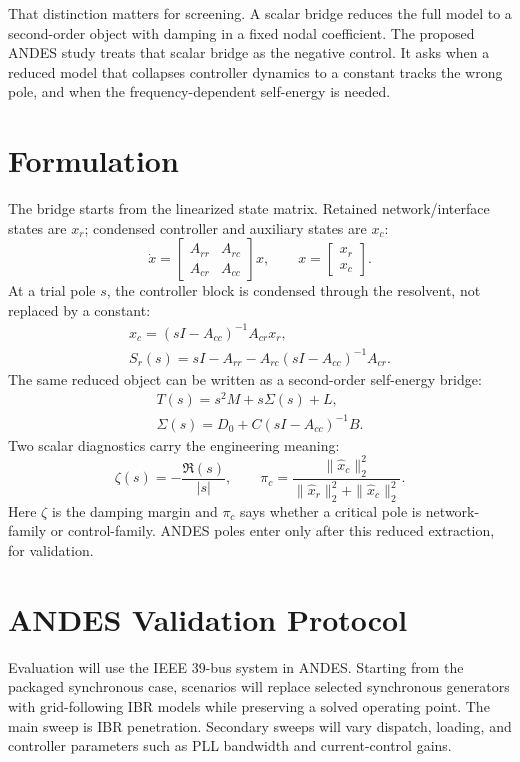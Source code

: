 \documentclass[conference,9pt]{IEEEtran}
\begin{document}
That distinction matters for screening. A scalar bridge reduces the full model to a second-order object with damping in a fixed nodal coefficient. The proposed ANDES study treats that scalar bridge as the negative control. It asks when a reduced model that collapses controller dynamics to a constant tracks the wrong pole, and when the frequency-dependent self-energy is needed.

\section{Formulation}

The bridge starts from the linearized state matrix. Retained network/interface states are \(x_r\); condensed controller and auxiliary states are \(x_c\):
{\small
\[
\dot{x}=\begin{bmatrix}A_{rr}&A_{rc}\\A_{cr}&A_{cc}\end{bmatrix}x,
\qquad
x=\begin{bmatrix}x_r\\x_c\end{bmatrix}.
\]
}
At a trial pole \(s\), the controller block is condensed through the resolvent, not replaced by a constant:
{\small
\[
\begin{gathered}
x_c=(sI-A_{cc})^{-1}A_{cr}x_r,\\
S_r(s)=sI-A_{rr}-A_{rc}(sI-A_{cc})^{-1}A_{cr}.
\end{gathered}
\]
}
The same reduced object can be written as a second-order self-energy bridge:
{\small
\[
\begin{gathered}
T(s)=s^2M+s\Sigma(s)+L,\\
\Sigma(s)=D_0+C(sI-A_{cc})^{-1}B .
\end{gathered}
\]
}
Two scalar diagnostics carry the engineering meaning:
{\small
\[
\zeta(s)=-\frac{\Re(s)}{|s|},\qquad
\pi_c=\frac{\|\hat{x}_c\|_2^2}{\|\hat{x}_r\|_2^2+\|\hat{x}_c\|_2^2}.
\]
}
Here \(\zeta\) is the damping margin and \(\pi_c\) says whether a critical pole is network-family or control-family. ANDES poles enter only after this reduced extraction, for validation.

\section{ANDES Validation Protocol}

Evaluation will use the IEEE 39-bus system in ANDES. Starting from the packaged synchronous case, scenarios will replace selected synchronous generators with grid-following IBR models while preserving a solved operating point. The main sweep is IBR penetration. Secondary sweeps will vary dispatch, loading, and controller parameters such as PLL bandwidth and current-control gains.
\end{document}
